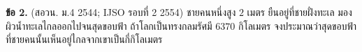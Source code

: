 \documentclass[12pt]{article}
\begin{document}
\textbf{ข้อ 2.} (สอวน. ม.4 2544; IJSO รอบที่ 2 2554)
ชายคนหนึ่งสูง $2$ เมตร ยืนอยู่ที่ชายฝั่งทะเล
มองผิวน้ำทะเลไกลออกไปจนสุดขอบฟ้า ถ้าโลกเป็นทรงกลมรัศมี $6370$ กิโลเมตร
จงประมาณว่าสุดขอบฟ้าที่ชายคนนั้นเห็นอยู่ไกลจากเขาเป็นกี่กิโลเมตร
\end{document}
